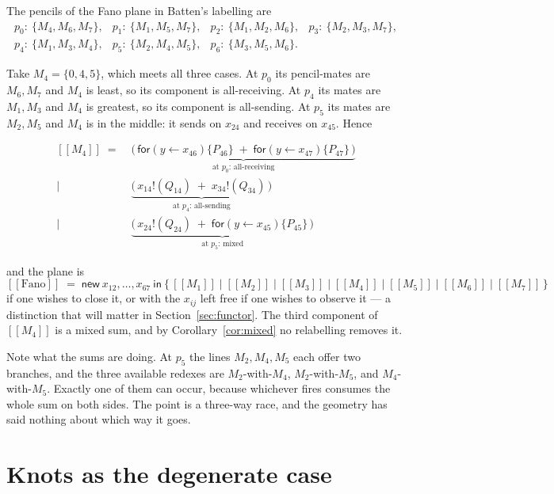 \documentclass[11pt]{article}
\theoremstyle{plain}
\theoremstyle{definition}
\theoremstyle{remark}
\newcommand{\enc}[1]{[\![#1]\!]}
\begin{document}
The pencils of the Fano plane in Batten's labelling are
\[
\begin{array}{llll}
p_0:\ \{M_4,M_6,M_7\}, & p_1:\ \{M_1,M_5,M_7\}, & p_2:\ \{M_1,M_2,M_6\}, & p_3:\ \{M_2,M_3,M_7\},\\
p_4:\ \{M_1,M_3,M_4\}, & p_5:\ \{M_2,M_4,M_5\}, & p_6:\ \{M_3,M_5,M_6\}. &
\end{array}
\]

Take $M_4 = \{0,4,5\}$, which meets all three cases. At $p_0$ its pencil-mates are
$M_6, M_7$ and $M_4$ is least, so its component is all-receiving. At $p_4$ its mates are
$M_1, M_3$ and $M_4$ is greatest, so its component is all-sending. At $p_5$ its mates are
$M_2, M_5$ and $M_4$ is in the middle: it sends on $x_{24}$ and receives on $x_{45}$. Hence

\[
\begin{aligned}
\enc{M_4} \;=\;
&\underbrace{\big(\,\mathsf{for}(y \leftarrow x_{46})\{P_{46}\} \;+\;
                  \mathsf{for}(y \leftarrow x_{47})\{P_{47}\}\,\big)}_{\text{at } p_0
                  \text{: all-receiving}}\\[2pt]
\Big|\;\;
&\underbrace{\big(\, x_{14}!(Q_{14}) \;+\; x_{34}!(Q_{34}) \,\big)}_{\text{at } p_4
                  \text{: all-sending}}\\[2pt]
\Big|\;\;
&\underbrace{\big(\, x_{24}!(Q_{24}) \;+\;
                  \mathsf{for}(y \leftarrow x_{45})\{P_{45}\} \,\big)}_{\text{at } p_5
                  \text{: mixed}}
\end{aligned}
\]

and the plane is
\[
\enc{\mathrm{Fano}} \;=\; \mathsf{new}\ x_{12},\dots,x_{67}\ \mathsf{in}\
\{\, \enc{M_1} \mid \enc{M_2} \mid \enc{M_3} \mid \enc{M_4} \mid \enc{M_5} \mid
\enc{M_6} \mid \enc{M_7} \,\}
\]
if one wishes to close it, or with the $x_{ij}$ left free if one wishes to observe it ---
a distinction that will matter in Section~\ref{sec:functor}. The third component of
$\enc{M_4}$ is a mixed sum, and by Corollary~\ref{cor:mixed} no relabelling removes it.

Note what the sums are doing. At $p_5$ the lines $M_2, M_4, M_5$ each offer two branches,
and the three available redexes are $M_2$-with-$M_4$, $M_2$-with-$M_5$, and
$M_4$-with-$M_5$. Exactly one of them can occur, because whichever fires consumes the
whole sum on both sides. The point is a three-way race, and the geometry has said nothing
about which way it goes.

\section{Knots as the degenerate case}
\label{sec:knots}
\end{document}
